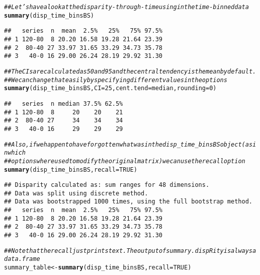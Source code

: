 \documentclass{article}\usepackage[]{graphicx}\usepackage[]{color}
\makeatletter
\newcommand{\hlnum}[1]{\textcolor[rgb]{0.686,0.059,0.569}{#1}}%
\newcommand{\hlcom}[1]{\textcolor[rgb]{0.678,0.584,0.686}{\textit{#1}}}%
\newcommand{\hlstd}[1]{\textcolor[rgb]{0.345,0.345,0.345}{#1}}%
\newcommand{\hlkwb}[1]{\textcolor[rgb]{0.69,0.353,0.396}{#1}}%
\newcommand{\hlkwc}[1]{\textcolor[rgb]{0.333,0.667,0.333}{#1}}%
\newcommand{\hlkwd}[1]{\textcolor[rgb]{0.737,0.353,0.396}{\textbf{#1}}}%
\newenvironment{kframe}{%
 \def\at@end@of@kframe{}%
 \ifinner\ifhmode%
  \def\at@end@of@kframe{\end{minipage}}%
  \begin{minipage}{\columnwidth}%
 \fi\fi%
 \def\FrameCommand##1{\hskip\@totalleftmargin \hskip-\fboxsep
 \colorbox{shadecolor}{##1}\hskip-\fboxsep
     \hskip-\linewidth \hskip-\@totalleftmargin \hskip\columnwidth}%
 \MakeFramed {\advance\hsize-\width
   \@totalleftmargin\z@ \linewidth\hsize
   \@setminipage}}%
 {\par\unskip\endMakeFramed%
 \at@end@of@kframe}
\newenvironment{knitrout}{}{} %
\makeatother
\begin{document}
\begin{knitrout}
\color{fgcolor}\begin{kframe}
\begin{alltt}
\hlcom{## Let's have a look at the disparity-through-time using in the time-binned data}
\hlkwd{summary}\hlstd{(disp_time_binsBS)}
\end{alltt}
\begin{verbatim}
##   series  n  mean  2.5%   25%   75% 97.5%
## 1 120-80  8 20.20 16.58 19.28 21.64 23.39
## 2  80-40 27 33.97 31.65 33.29 34.73 35.78
## 3   40-0 16 29.00 26.24 28.19 29.92 31.30
\end{verbatim}
\begin{alltt}
\hlcom{## The CIs are calculated as 50 and 95 and the central tendency is the mean by default.}
\hlcom{## We can change that easily by specifying different values in the options}
\hlkwd{summary}\hlstd{(disp_time_binsBS,} \hlkwc{CI} \hlstd{=} \hlnum{25}\hlstd{,} \hlkwc{cent.tend} \hlstd{= median,} \hlkwc{rounding} \hlstd{=} \hlnum{0}\hlstd{)}
\end{alltt}
\begin{verbatim}
##   series  n median 37.5% 62.5%
## 1 120-80  8     20    20    21
## 2  80-40 27     34    34    34
## 3   40-0 16     29    29    29
\end{verbatim}
\begin{alltt}
\hlcom{## Also, if we happen to have forgotten what was in the disp_time_binsBS object (as in which}
\hlcom{## options where used to modify the original matrix) we can use the recall option}
\hlkwd{summary}\hlstd{(disp_time_binsBS,} \hlkwc{recall} \hlstd{=} \hlnum{TRUE}\hlstd{)}
\end{alltt}
\begin{verbatim}
## Disparity calculated as: sum ranges for 48 dimensions.
## Data was split using discrete method.
## Data was bootstrapped 1000 times, using the full bootstrap method.
##   series  n  mean  2.5%   25%   75% 97.5%
## 1 120-80  8 20.20 16.58 19.28 21.64 23.39
## 2  80-40 27 33.97 31.65 33.29 34.73 35.78
## 3   40-0 16 29.00 26.24 28.19 29.92 31.30
\end{verbatim}
\begin{alltt}
\hlcom{## Note that the recall just prints text. The output of summary.dispRity is always a data.frame}
\hlstd{summary_table} \hlkwb{<-} \hlkwd{summary}\hlstd{(disp_time_binsBS,} \hlkwc{recall} \hlstd{=} \hlnum{TRUE}\hlstd{)}
\end{alltt}
\begin{verbatim}

\end{verbatim}
\end{kframe}
\end{knitrout}
\end{document}
